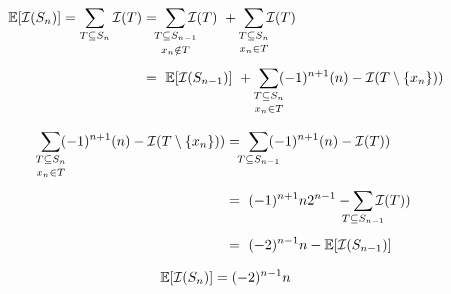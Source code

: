 
\begin{align*}
\E[\mathcal{I}(S_{n})]
= \sum_{T \subseteq S_{n}} \mathcal{I} (T)
& 
= \ \sum_{\mathclap{\substack{T \subseteq S_{n-1} \\[0.5ex] x_{n} \notin T}}} \mathcal{I} (T)
\ +\ \sum_{\mathclap{\substack{T \subseteq S_{n} \\[0.5ex] x_{n} \in T}}} \mathcal{I} (T)
\\[1ex]
&
= \ \E[\mathcal{I}(S_{n-1})]
\ +\ \sum_{\mathclap{\substack{T \subseteq S_{n} \\[0.5ex] x_{n} \in T}}} (-1)^{n+1}(n)-\mathcal{I} (T\setminus\{x_{n}\}))
\end{align*}

\begin{align*}
\sum_{\mathclap{\substack{T \subseteq S_{n} \\[0.5ex] x_{n} \in T}}} (-1)^{n+1}(n)-\mathcal{I} (T\setminus\{x_{n}\}))
&
= \ \sum_{\mathclap{\substack{T \subseteq S_{n-1}}}} (-1)^{n+1}(n)-\mathcal{I} (T))
\\[1ex]
& 
= \ (-1)^{n+1}n2^{n-1} - \sum_{\mathclap{\substack{T \subseteq S_{n-1}}}}\mathcal{I} (T))
\\[1ex]
& 
= \ (-2)^{n-1}n - \E[\mathcal{I}(S_{n-1})]
\end{align*}

\begin{align*}
\operatorname{\mathbb{E}}[\mathcal{I}(S_{n})] = (-2)^{n-1}n
\end{align*}